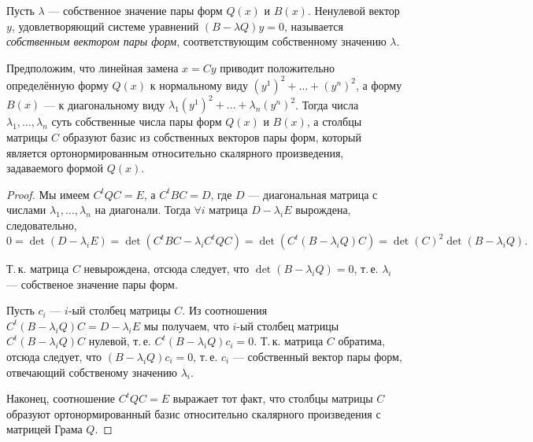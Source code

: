 Пусть $\lambda$ --- собственное значение пары форм $Q(x)$ и $B(x)$. Ненулевой вектор $y$, удовлетворяющий системе уравнений $(B - \lambda Q)y = 0$, называется \textit{собственным вектором пары форм}, соответствующим собственному значению $\lambda$.

\begin{theorem}
    Предположим, что линейная замена $x = Cy$ приводит положительно определённую форму $Q(x)$ к нормальному виду $(y^1)^2 + \ldots + (y^n)^2$, а форму $B(x)$ --- к диагональному виду $\lambda_1(y^1)^2 + \ldots + \lambda_n(y^n)^2$. Тогда числа $\lambda_1, \ldots, \lambda_n$ суть собственные числа пары форм $Q(x)$ и $B(x)$, а столбцы матрицы $C$ образуют базис из собственных векторов пары форм, который является ортонормированным относительно скалярного произведения, задаваемого формой $Q(x)$.
\end{theorem}

\begin{proof}
    Мы имеем $C^tQC = E$, а $C^tBC = D$, где $D$ --- диагональная матрица с числами $\lambda_1, \ldots, \lambda_n$ на диагонали. Тогда $\forall i$ матрица $D - \lambda_iE$ вырождена, следовательно,
    \[
        0 = \det(D - \lambda_iE) = \det(C^tBC - \lambda_iC^tQC) = \det(C^t(B - \lambda_iQ)C) = \det(C)^2\det(B - \lambda_iQ).
    \]

    Т.\,к. матрица $C$ невырождена, отсюда следует, что $\det(B - \lambda_iQ) = 0$, т.\,е. $\lambda_i$ --- собственое значение пары форм.

    Пусть $c_i$ --- $i$-ый столбец матрицы $C$. Из соотношения $C^t(B - \lambda_iQ)C = D - \lambda_iE$ мы получаем, что $i$-ый столбец матрицы $C^t(B - \lambda_iQ)C$ нулевой, т.\,е. $C^t(B - \lambda_iQ)c_i = 0$. Т.\,к. матрица $C$ обратима, отсюда следует, что $(B - \lambda_iQ)c_i = 0$, т.\,е. $c_i$ --- собственный вектор пары форм, отвечающий собственому значению $\lambda_i$.

    Наконец, соотношение $C^tQC = E$ выражает тот факт, что столбцы матрицы $C$ образуют ортонормированный базис относительно скалярного произведения с матрицей Грама $Q$.
\end{proof}

